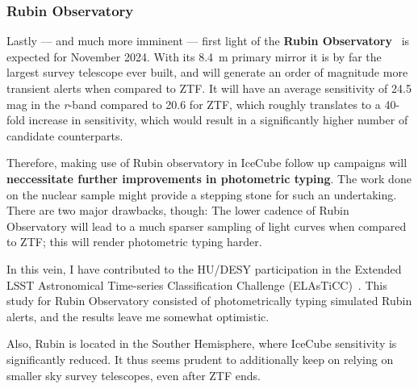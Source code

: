 \subsubsection{Rubin Observatory}
Lastly --- and much more imminent --- first light of the \textbf{Rubin Observatory}~\cite{Ivezic2019} is expected for November 2024. With its \SI{8.4}{\m} primary mirror it is by far the largest survey telescope ever built, and will generate an order of magnitude more transient alerts when compared to ZTF. It will have an average sensitivity of 24.5 mag in the \textit{r}-band compared to 20.6 for ZTF, which roughly translates to a 40-fold increase in sensitivity, which would result in a significantly higher number of candidate counterparts.

Therefore, making use of Rubin observatory in IceCube follow up campaigns will \textbf{neccessitate further improvements in photometric typing}. The work done on the nuclear sample might provide a stepping stone for such an undertaking. There are two major drawbacks, though: The lower cadence of Rubin Observatory will lead to a much sparser sampling of light curves when compared to ZTF; this will render photometric typing harder.

In this vein, I have contributed to the HU/DESY participation in the Extended LSST Astronomical Time-series Classification Challenge (ELAsTiCC)~. This study for Rubin Observatory consisted of photometrically typing simulated Rubin alerts, and the results leave me somewhat optimistic.

Also, Rubin is located in the Souther Hemisphere, where IceCube sensitivity is significantly reduced. It thus seems prudent to additionally keep on relying on smaller sky survey telescopes, even after ZTF ends.